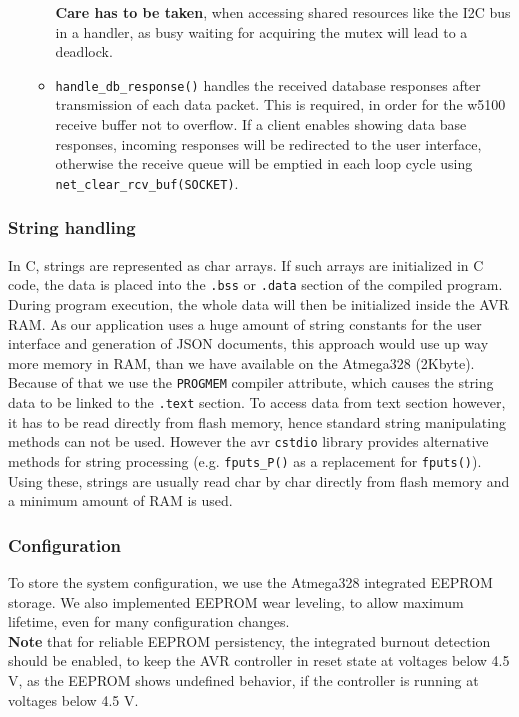 \documentclass[a4paper]{scrreprt}
\begin{document}
\begin{enumerate}
\begin{itemize}
    \textbf{Care has to be taken}, when accessing shared resources like the I2C bus in a handler, as busy waiting for acquiring the mutex will lead to a deadlock.
        \item \texttt{handle\_db\_response()} handles the received database responses after transmission of each data packet. This is required, in order for the w5100 receive buffer not to overflow.
            If a client enables showing data base responses, incoming responses will be redirected to the user interface,
otherwise the receive queue will be emptied in each loop cycle using \texttt{net\_clear\_rcv\_buf(SOCKET)}.
    \end{itemize}
\end{enumerate}
\subsubsection{String handling}
In C, strings are represented as char arrays. If such arrays are initialized in C code, the data is placed
into the \texttt{.bss} or \texttt{.data} section of the compiled program. During program execution, the whole data
will then be initialized inside the AVR RAM. As our application uses a huge amount of string constants for the user interface and
generation of JSON documents, this approach would use up way more memory in RAM, than we have available on the Atmega328 (2Kbyte).\\
Because of that we use the \texttt{PROGMEM} compiler attribute, which causes the string data to be linked to the \texttt{.text} section.
To access data from text section however, it has to be read directly from flash memory, hence standard string manipulating methods
can not be used. However the avr \texttt{cstdio} library provides alternative methods for string processing (e.g. \texttt{fputs\_P()}
as a replacement for \texttt{fputs()}). Using these, strings are usually read char by char directly from flash memory and a minimum
amount of RAM is used.
\subsubsection{Configuration}
To store the system configuration, we use the Atmega328 integrated EEPROM storage. We also implemented EEPROM wear leveling, to allow
maximum lifetime, even for many configuration changes.\\
\textbf{Note} that for reliable EEPROM persistency, the integrated burnout detection should be enabled, to keep the AVR controller in reset state at voltages below 4.5 V, as the EEPROM shows undefined behavior, if the controller is running at voltages below 4.5 V.
\end{document}
